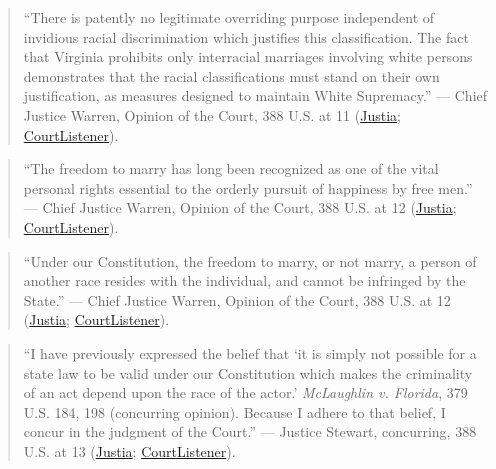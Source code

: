 \documentclass[12pt]{article}
\begin{document}
\begin{quote}
``There is patently no legitimate overriding purpose independent of invidious racial discrimination which justifies this classification. The fact that Virginia prohibits only interracial marriages involving white persons demonstrates that the racial classifications must stand on their own justification, as measures designed to maintain White Supremacy.''
--- Chief Justice Warren, Opinion of the Court, 388 U.S. at 11 (\href{https://supreme.justia.com/cases/federal/us/388/1/}{Justia}; \href{https://www.courtlistener.com/opinion/107480/loving-v-virginia/}{CourtListener}).
\end{quote}

\begin{quote}
``The freedom to marry has long been recognized as one of the vital personal rights essential to the orderly pursuit of happiness by free men.''
--- Chief Justice Warren, Opinion of the Court, 388 U.S. at 12 (\href{https://supreme.justia.com/cases/federal/us/388/1/}{Justia}; \href{https://www.courtlistener.com/opinion/107480/loving-v-virginia/}{CourtListener}).
\end{quote}

\begin{quote}
``Under our Constitution, the freedom to marry, or not marry, a person of another race resides with the individual, and cannot be infringed by the State.''
--- Chief Justice Warren, Opinion of the Court, 388 U.S. at 12 (\href{https://supreme.justia.com/cases/federal/us/388/1/}{Justia}; \href{https://www.courtlistener.com/opinion/107480/loving-v-virginia/}{CourtListener}).
\end{quote}

\begin{quote}
``I have previously expressed the belief that `it is simply not possible for a state law to be valid under our Constitution which makes the criminality of an act depend upon the race of the actor.' \textit{McLaughlin v. Florida}, 379 U.S. 184, 198 (concurring opinion). Because I adhere to that belief, I concur in the judgment of the Court.''
--- Justice Stewart, concurring, 388 U.S. at 13 (\href{https://supreme.justia.com/cases/federal/us/388/1/}{Justia}; \href{https://www.courtlistener.com/opinion/107480/loving-v-virginia/}{CourtListener}).
\end{quote}
\end{document}
